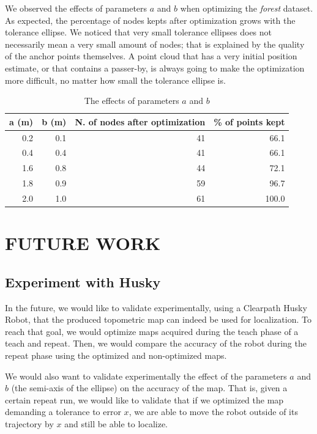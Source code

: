 \documentclass[letterpaper,10 pt,conference]{ieeeconf}
\begin{document}
We observed the effects of parameters $a$ and $b$ when optimizing the \textit{forest} dataset. As
expected, the percentage of nodes kepts after optimization grows with the tolerance ellipse. We
noticed that very small tolerance ellipses does not necessarily mean a very small amount of nodes;
that is explained by the quality of the anchor points themselves. A point cloud that has a very 
initial position estimate, or that contains a passer-by, is always going to make the optimization
more difficult, no matter how small the tolerance ellipse is.

\begin{table}[h]
\centering
\begin{tabular}{|r|r|r|r|}
  \hline
a (m) & b (m) &  N. of nodes after optimization & \% of points kept \\
\hline
  0.2 & 0.1 & 41 & 66.1  \\
\hline
 0.4 & 0.4 & 41 & 66.1 \\
  \hline
 1.6 & 0.8 & 44 & 72.1 \\
  \hline
1.8 & 0.9 & 59 & 96.7 \\
  \hline
  2.0 & 1.0 & 61 & 100.0 \\
  \hline
\end{tabular}
\caption{The effects of parameters $a$ and $b$}
\label{tabopti}
\end{table}

\section{FUTURE WORK}

\subsection{Experiment with Husky} In the future, we would like to validate
experimentally, using a Clearpath Husky Robot, that the produced topometric map
can indeed be used for localization. To reach that goal, we would optimize maps
acquired during the teach phase of a teach and repeat. Then, we would compare
the accuracy of the robot during the repeat phase using the optimized and
non-optimized maps.

We would also want to validate experimentally the effect of the parameters $a$ and $b$ (the semi-axis of the ellipse)
on the accuracy of the map. That is, given a certain repeat run, we would like to validate that if
we optimized the map demanding a tolerance to error $x$, we are able to move the robot outside of
its trajectory by $x$ and still be able to localize.
\end{document}
